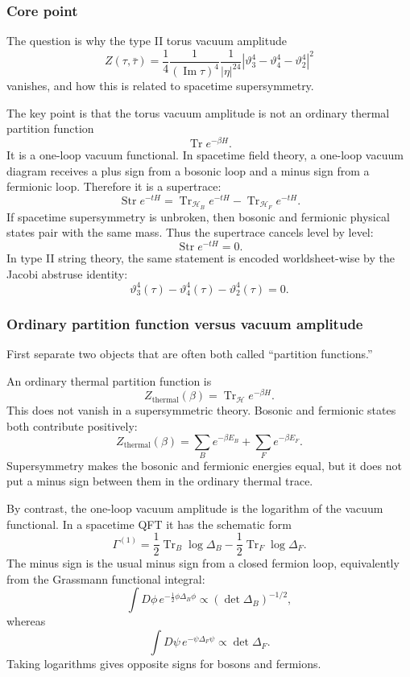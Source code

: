 \documentclass[
  10pt,
  a4paper,
  openany]{book}
\begin{document}
\subsubsection{Core point}\label{core-point-9}

The question is why the type II torus vacuum amplitude \[
Z(\tau,\bar\tau)
=
\frac{1}{4}
\frac{1}{(\operatorname{Im}\tau)^4}
\frac{1}{|\eta|^{24}}
\left|
\vartheta_3^4-\vartheta_4^4-\vartheta_2^4
\right|^2
\] vanishes, and how this is related to spacetime supersymmetry.

The key point is that the torus vacuum amplitude is not an ordinary
thermal partition function \[
\operatorname{Tr}e^{-\beta H}.
\] It is a one-loop vacuum functional. In spacetime field theory, a
one-loop vacuum diagram receives a plus sign from a bosonic loop and a
minus sign from a fermionic loop. Therefore it is a supertrace: \[
\operatorname{Str}e^{-tH}
=
\operatorname{Tr}_{\mathcal H_B}e^{-tH}
-
\operatorname{Tr}_{\mathcal H_F}e^{-tH}.
\] If spacetime supersymmetry is unbroken, then bosonic and fermionic
physical states pair with the same mass. Thus the supertrace cancels
level by level: \[
\operatorname{Str}e^{-tH}=0.
\] In type II string theory, the same statement is encoded
worldsheet-wise by the Jacobi abstruse identity: \[
\vartheta_3^4(\tau)-\vartheta_4^4(\tau)-\vartheta_2^4(\tau)=0.
\]

\subsubsection{Ordinary partition function versus vacuum
amplitude}\label{ordinary-partition-function-versus-vacuum-amplitude}

First separate two objects that are often both called ``partition
functions.''

An ordinary thermal partition function is \[
Z_{\mathrm{thermal}}(\beta)
=
\operatorname{Tr}_{\mathcal H}
e^{-\beta H}.
\] This does not vanish in a supersymmetric theory. Bosonic and
fermionic states both contribute positively: \[
Z_{\mathrm{thermal}}(\beta)
=
\sum_{B}e^{-\beta E_B}
+
\sum_{F}e^{-\beta E_F}.
\] Supersymmetry makes the bosonic and fermionic energies equal, but it
does not put a minus sign between them in the ordinary thermal trace.

By contrast, the one-loop vacuum amplitude is the logarithm of the
vacuum functional. In a spacetime QFT it has the schematic form \[
\Gamma^{(1)}
=
\frac{1}{2}\operatorname{Tr}_B\log \Delta_B
-
\frac{1}{2}\operatorname{Tr}_F\log \Delta_F.
\] The minus sign is the usual minus sign from a closed fermion loop,
equivalently from the Grassmann functional integral: \[
\int D\phi\,e^{-\frac{1}{2}\phi\Delta_B\phi}
\propto
(\det\Delta_B)^{-1/2},
\] whereas \[
\int D\psi\,e^{-\psi\Delta_F\psi}
\propto
\det\Delta_F.
\] Taking logarithms gives opposite signs for bosons and fermions.
\end{document}

